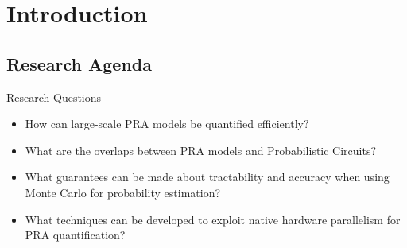 \section{Introduction}
\subsection{Research Agenda}
\begin{frame}{Research Questions}
  \begin{itemize}
    \item{How can large-scale PRA models be quantified efficiently?}
        \vspace{4pt}
    \item {What are the overlaps between PRA models and Probabilistic Circuits?}
    \vspace{4pt}
    \item{What guarantees can be made about tractability and accuracy when using Monte Carlo for probability estimation?}
        \vspace{4pt}
    \item {What techniques can be developed to exploit native hardware parallelism for PRA quantification?}
    \vspace{4pt}

  \end{itemize}
\end{frame}
